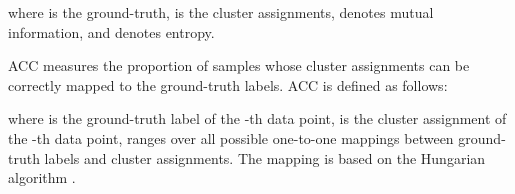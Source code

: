 where  is the ground-truth,  is the cluster assignments,  denotes mutual information, and  denotes entropy.

ACC measures the proportion of samples whose cluster assignments can be correctly mapped to the ground-truth labels. ACC is defined as follows:

where  is the ground-truth label of the -th data point,  is the cluster assignment of the -th data point,  ranges over all possible one-to-one mappings between ground-truth labels and cluster assignments. The mapping is based on the Hungarian algorithm \cite{kuhn2005hungarian}. 

\begin{table*}[!htb]
	\caption{Clustering results of different algorithms in terms of the unsupervised clustering accuracy (ACC\%) and normalized mutual information (NMI\%). The results marked by  come from the original papers.  denotes that the result is not available. DEKM\_F means that DEKM uses the full-batch updating strategy.}
	\begin{center}
\end{center}
\end{table*}
